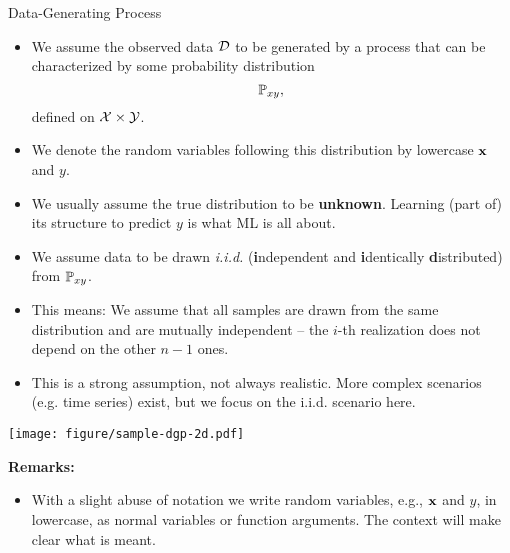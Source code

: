 \documentclass[11pt,compress,t,notes=noshow, xcolor=table]{beamer}
\begin{document}
\begin{vbframe}{Data-Generating Process}

\begin{itemize}

  \item We assume the observed data $\mathcal{D}$ to be generated by a process that can
  be characterized by some probability distribution $$\mathbb{P}_{xy},$$ defined on 
  $\mathcal{X} \times \mathcal{Y}$.
  
  \item We denote the random variables following this 
  distribution by lowercase $\mathbf{x}$ and $y$.
  
  \item We usually assume the true distribution to be \textbf{unknown}. 
  Learning (part of) its structure to predict $y$ is what ML is all about.
  
  \framebreak
  
  \item We assume data to be drawn \emph{i.i.d.} (\textbf{i}ndependent and \textbf{i}dentically 
    \textbf{d}istributed) from $\mathbb{P}_{xy}$. %

    
    \item This means: We assume that all samples are drawn from the same distribution 
    and are mutually independent -- the $i$-th realization does not depend on the
    other $n-1$ ones.
    
    \item This is a strong assumption, not always realistic. 
    More complex scenarios (e.g. time series) exist, but we focus on the i.i.d. scenario here. 
\end{itemize}

{
\texttt{[image: figure/sample-dgp-2d.pdf]}
}

\framebreak

\textbf{Remarks:}

\begin{itemize}

  \item With a slight abuse of notation we write random variables, e.g., $\mathbf{x}$ 
  and $y$, in lowercase, as normal variables or function arguments. The context 
  will make clear what is meant.
  

\end{itemize}
\end{vbframe}
\end{document}
